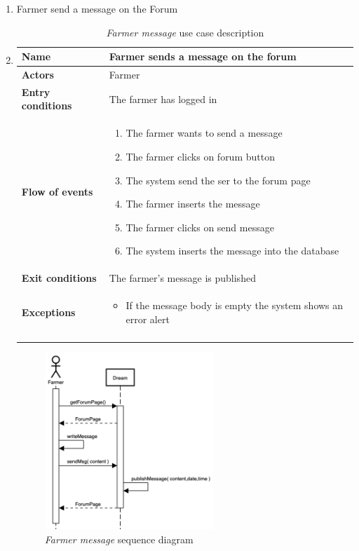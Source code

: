 \begin{enumerate}
        \item Farmer send a message on the Forum
        \item \begin{longtable}{p{0.26\linewidth}p{0.75\linewidth}}
            \toprule
            \textbf{Name} & \textbf{Farmer sends a message on the forum} \\
            \midrule
            \textbf{Actors} & Farmer \\
            \midrule
            \textbf{Entry conditions} & The farmer has logged in\\
            \midrule
            \textbf{Flow of events} & 
            \begin{enumerate}
                \item The farmer wants to send a message
                \item The farmer clicks on forum button
                \item The system send the ser to the forum page
                \item The farmer inserts the message 
                \item The farmer clicks on send message
                \item The system inserts the message into the database 
            \end{enumerate} \\
            \midrule
            \textbf{Exit conditions} & The farmer's message is published\\
            \midrule
            \textbf{Exceptions} & 
            \begin{itemize}
                \item If the message body is empty the system shows an error alert
            \end{itemize} \\
            \bottomrule
            \caption{\emph{Farmer message} use case description}
        \end{longtable}
        \begin{figure}[H]
            \begin{center}
            \includegraphics[width=0.6\textwidth]{sequence/messageOnForum.png}
            \caption{\emph{Farmer message} sequence diagram}
            \label{fig:sequence3}
        \end{center}
        \end{figure}


\end{enumerate}
